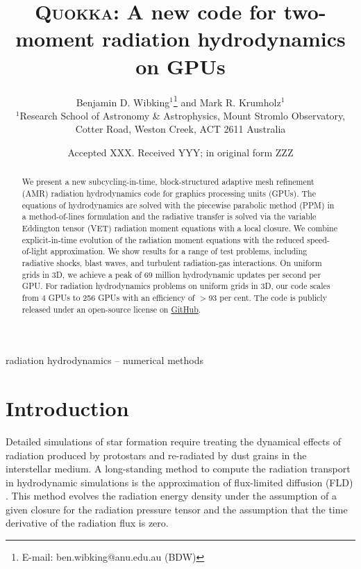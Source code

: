 \documentclass[fleqn,usenatbib]{mnras}
\title[Two-moment radiation hydrodynamics on GPUs]{\textsc{Quokka}: A new code for two-moment radiation hydrodynamics on GPUs}
\author[B. D. Wibking et al.]{
    Benjamin D. Wibking$^{1}$\thanks{E-mail: ben.wibking@anu.edu.au (BDW)}
    and Mark R. Krumholz$^{1}$
\\
$^{1}$Research School of Astronomy \& Astrophysics, Mount Stromlo Observatory, Cotter Road, Weston Creek, ACT 2611 Australia\\
}
\date{Accepted XXX. Received YYY; in original form ZZZ}
\begin{document}
\label{firstpage}
\pagerange{\pageref{firstpage}--\pageref{lastpage}}
\maketitle

\begin{abstract}
    We present a new subcycling-in-time, block-structured adaptive mesh refinement (AMR) radiation hydrodynamics code for graphics processing units (GPUs). The equations of hydrodynamics are solved with the piecewise parabolic method (PPM) in a method-of-lines formulation and the radiative transfer is solved via the variable Eddington tensor (VET) radiation moment equations with a local closure. We combine explicit-in-time evolution of the radiation moment equations with the reduced speed-of-light approximation. We show results for a range of test problems, including radiative shocks, blast waves, and turbulent radiation-gas interactions. On uniform grids in 3D, we achieve a peak of $69$ million hydrodynamic updates per second per GPU. For radiation hydrodynamics problems on uniform grids in 3D, our code scales from 4 GPUs to 256 GPUs with an efficiency of $>93$ per cent. The code is publicly released under an open-source license on \faGithub\href{https://github.com/BenWibking/quokka-code}{GitHub}.
\end{abstract}

\begin{keywords}
radiation hydrodynamics -- numerical methods
\end{keywords}



\section{Introduction}
Detailed simulations of star formation require treating the dynamical effects of radiation produced by protostars and re-radiated by dust grains in the interstellar medium. A long-standing method to compute the radiation transport in hydrodynamic simulations is the approximation of flux-limited diffusion (FLD) \citep{Alme_1973}. This method evolves the radiation energy density under the assumption of a given closure for the radiation pressure tensor and the assumption that the time derivative of the radiation flux is zero.
\end{document}
